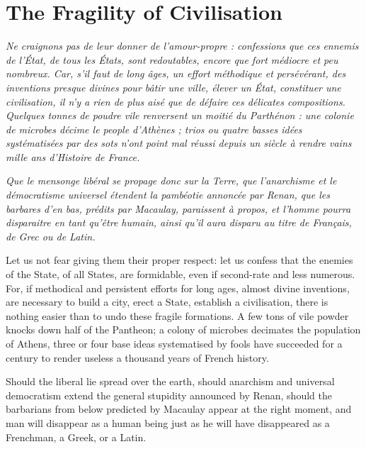 \section{The Fragility of Civilisation}

\begin{quotationx}
\textit{Ne craignons pas de leur donner de l'amour-propre : confessions que ces ennemis de l'État, de tous les États, sont redoutables, encore que fort médiocre et peu nombreux. Car, s'il faut de long âges, un effort méthodique et persévérant, des inventions presque divines pour bâtir une ville, élever un État, constituer une civilisation, il n'y a rien de plus aisé que de défaire ces délicates compositions. Quelques tonnes de poudre vile renversent un moitié du Parthénon : une colonie de microbes décime le people d'Athènes ; trios ou quatre basses idées systématisées par des sots n'ont point mal réussi depuis un siècle à rendre vains mille ans d'Histoire de France.}

\textit{Que le mensonge libéral se propage donc sur la Terre, que l'anarchisme et le démocratisme universel étendent la pambéotie annoncée par Renan, que les barbares d'en bas, prédits par Macaulay, paraissent à propos, et l'homme pourra disparaitre en tant qu'être humain, ainsi qu'il aura disparu au titre de Français, de Grec ou de Latin.}
\end{quotationx}


\begin{quotationx}
Let us not fear giving them their proper respect: let us confess that the enemies of the State, of all States, are formidable, even if second-rate and less numerous. For, if methodical and persistent efforts for long ages, almost divine inventions, are necessary to build a city, erect a State, establish a civilisation, there is nothing easier than to undo these fragile formations. A few tons of vile powder knocks down half of the Pantheon; a colony of microbes decimates the population of Athens, three or four base ideas systematised by fools have succeeded for a century to render useless a thousand years of French history.

Should the liberal lie spread over the earth, should anarchism and universal democratism extend the general stupidity announced by Renan, should the barbarians from below predicted by Macaulay appear at the right moment, and man will disappear as a human being just as he will have disappeared as a Frenchman, a Greek, or a Latin.
\end{quotationx}





